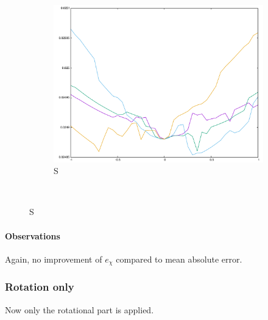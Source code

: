 \begin{figure}[H]
\begin{subfigure}{.33\textwidth}
	\includegraphics[width=\linewidth]{fig/ajherr/t3t/S_mae.pdf}
	\caption{S}
\end{subfigure}\\
\end{figure}

\paragraph{Observations} Again, no improvement of $e_{\chi}$ compared to mean absolute error.



\subsubsection{Rotation only}
Now only the rotational part is applied.


